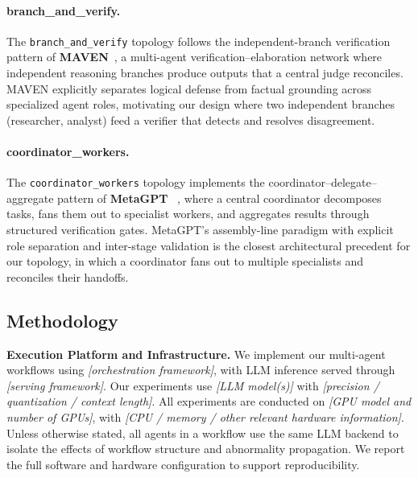 \paragraph{branch\_and\_verify.}
The \texttt{branch\_and\_verify} topology follows the independent-branch
verification pattern of \textbf{MAVEN}~\citep{yao2026maven}, a
multi-agent verification--elaboration network where independent reasoning
branches produce outputs that a central judge reconciles. MAVEN explicitly
separates logical defense from factual grounding across specialized agent
roles, motivating our design where two independent branches (researcher,
analyst) feed a verifier that detects and resolves disagreement.

\paragraph{coordinator\_workers.}
The \texttt{coordinator\_workers} topology implements the
coordinator--delegate--aggregate pattern of \textbf{MetaGPT}
~\citep{hong2023metagpt}, where a central coordinator decomposes tasks,
fans them out to specialist workers, and aggregates results through
structured verification gates. MetaGPT's assembly-line paradigm with
explicit role separation and inter-stage validation is the closest
architectural precedent for our topology, in which a coordinator fans out
to multiple specialists and reconciles their handoffs.

\subsection{Methodology}


\color{teal}
\textbf{Execution Platform and Infrastructure.}
We implement our multi-agent workflows using \textit{[orchestration framework]}, with LLM inference served through \textit{[serving framework]}.
Our experiments use \textit{[LLM model(s)]} with \textit{[precision / quantization / context length]}.
All experiments are conducted on \textit{[GPU model and number of GPUs]}, with \textit{[CPU / memory / other relevant hardware information]}.
Unless otherwise stated, all agents in a workflow use the same LLM backend to isolate the effects of workflow structure and abnormality propagation. We report the full software and hardware configuration to support reproducibility.

